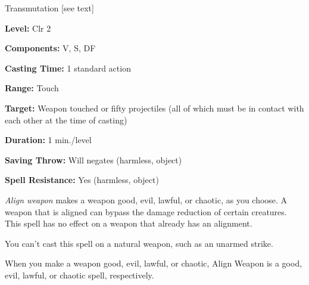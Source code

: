 
Transmutation [see text]

\textbf{Level:} Clr 2

\textbf{Components:} V, S, DF

\textbf{Casting Time:} 1 standard action

\textbf{Range:} Touch

\textbf{Target:} Weapon touched or fifty projectiles (all of which must be in contact 
with each other at the time of casting)

\textbf{Duration:} 1 min./level

\textbf{Saving Throw:} Will negates (harmless, object)

\textbf{Spell Resistance:} Yes (harmless, object)

\textit{Align weapon} makes a weapon good, evil, lawful, or chaotic, as you choose. 
A weapon that is aligned can bypass the damage reduction of certain creatures. 
This spell has no effect on a weapon that already has an alignment.

You can't cast this spell on a natural weapon, such as an unarmed strike.

When you make a weapon good, evil, lawful, or chaotic, Align Weapon is 
a good, evil, lawful, or chaotic spell, respectively.

